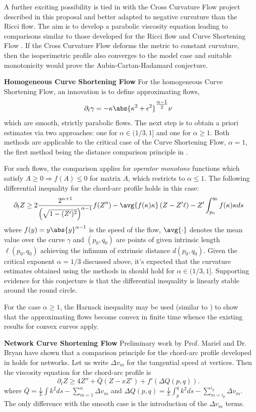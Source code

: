 \documentclass[12pt]{amsart}
\begin{document}
A further exciting possibility is tied in with the Cross Curvature Flow project described in this proposal and better adapted to negative curvature than the Ricci flow. The aim is to develop a parabolic viscosity equation leading to comparisons similar to those developed for the Ricci flow and Curve Shortening Flow \cite{MR2729306,MR2843240,pbthesis,Bryan}. If the Cross Curvature Flow deforms the metric to constant curvature, then the isoperimetric profile also converges to the model case and suitable monotonicity would prove the Aubin-Cartan-Hadamard conjecture.

\noindent\textbf{Homogeneous Curve Shortening Flow}
\label{sec-3-2}
For the homogeneous Curve Shortening Flow, an innovation is to define approximating flows,
\[
\partial_t \gamma = -\kappa\abs{\kappa^2 + \epsilon^2}^{\tfrac{\alpha-1}{2}} \nu
\]
which are smooth, strictly parabolic flows. The next step is to obtain a priori estimates via two approaches: one for $\alpha \in (1/3, 1]$ and one for $\alpha \geq 1$. Both methods are applicable to the critical case of the Curve Shortening Flow, $\alpha = 1$, the first method being the distance comparison principle in \cite{MR2794630}.

For such flows, the comparison applies for \emph{operator monotone} functions which satisfy $A \geq 0 \Rightarrow f(A) \leq 0$ for matrix $A$, which restricts to $\alpha \leq 1$. The following differential inequality for the chord-arc profile holds in this case:
\[
\partial_t Z \geq 2 \frac{2^{\alpha+1}}{\left(\sqrt{1 - (Z')^2}\right)^{\alpha-1}} f(Z'') - \avg{f(\kappa) \kappa} \left(Z - Z'\ell\right) - Z' \int_{p_0}^{q_0} f(\kappa)\kappa ds
\]
where $f(y) = y\abs{y}^{\alpha-1}$ is the speed of the flow, $\avg{\cdot}$ denotes the mean value over the curve $\gamma$ and $(p_0, q_0)$ are points of given intrinsic length $\ell(p_0, q_0)$ achieving the infimum of extrinsic distance $d(p_0, q_0)$. Given the critical exponent $\alpha=1/3$ discussed above, it's expected that the curvature estimates obtained using the methods in \cite{MR2794630} should hold for $\alpha \in (1/3, 1]$. Supporting evidence for this conjecture is that the differential inequality is linearly stable around the round circle.

For the case $\alpha \geq 1$, the Harnack inequality may be used (similar to \cite{MR1094458}) to show that the approximating flows become convex in finite time whence the existing results for convex curves apply.

\noindent\textbf{Network Curve Shortening Flow}
\label{sec-3-3}
Preliminary work by Prof. Mariel \saez{} and Dr. Bryan have shown that a comparison principle for the chord-arc profile developed in \cite{MR2794630} holds for networks. Let us write $\Delta v_m$ for the tangential speed at vertices. Then the viscosity equation for the chord-arc profile is
\[
\partial_t Z \geq 4Z''+\bar{Q}(Z-xZ')+f'(\Delta Q(p,q)).
\]
where $\bar{Q}=\frac{1}{L}\int k^2 ds-\sum_{m=1}^n \Delta v_m$ and $\Delta Q(p,q)=\frac{1}{L}\int_p^q k^2 ds-\sum_{m=i_p}^{i_q} \Delta v_m$. The only difference with the smooth case is the introduction of the $\Delta v_m$ terms.
\end{document}
